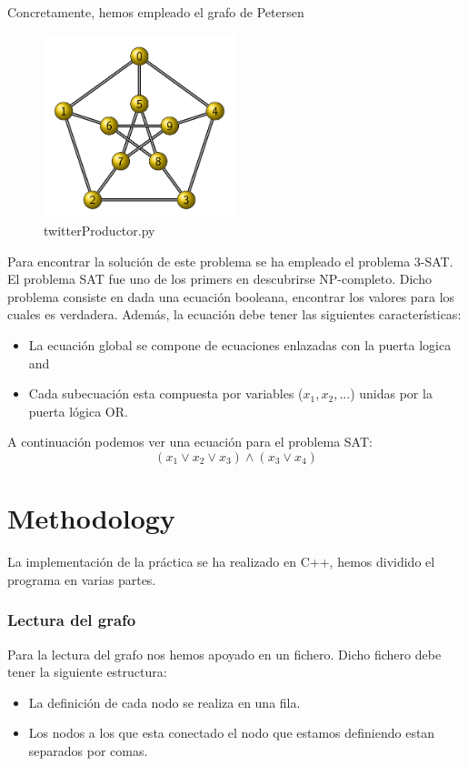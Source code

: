 \documentclass{article}
\begin{document}
	Concretamente, hemos empleado el grafo de Petersen

    \begin{figure}[H]
        \centering
        \includegraphics[width=0.5\textwidth]{pictures/PetersenGraph.png}
        \caption{twitterProductor.py}
    \end{figure}

    Para encontrar la solución de este problema se ha empleado el problema 3-SAT. 
    El problema SAT fue uno de los primers en descubrirse NP-completo. Dicho problema consiste 
    en dada una ecuación booleana, encontrar los valores para los cuales es verdadera. Además, la 
    ecuación debe tener las siguientes características: 
    \begin{itemize}
        \item La ecuación global se compone de ecuaciones enlazadas con la puerta logica and
        \item Cada subecuación esta compuesta por variables ($x_1, x_2, ...$) unidas por la puerta lógica OR.
    \end{itemize}

    A continuación podemos ver una ecuación para el problema SAT:
        \[ ( x_1 \vee x_2 \vee x_3) \wedge (x_3 \vee x_4)\]

    
\section{Methodology}
    La implementación de la práctica se ha realizado en C++, hemos dividido el programa en varias partes.
    \subsubsection{Lectura del grafo}
        Para la lectura del grafo nos hemos apoyado en un fichero. Dicho fichero debe tener la siguiente estructura:
        \begin{itemize}
            \item La definición de cada nodo se realiza en una fila. 
            \item Los nodos a los que esta conectado el nodo que estamos definiendo estan separados por comas. 
        \end{itemize}
        
\end{document}
